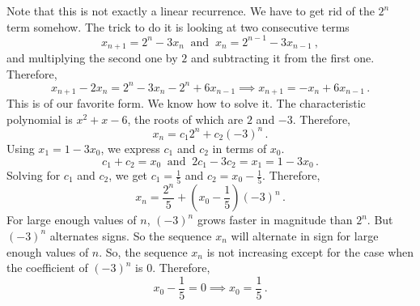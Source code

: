 \documentclass[11pt]{scrartcl}
\begin{document}
\begin{soln}
Note that this is not exactly a linear recurrence. We have to get rid of the \(2^n\) term somehow. The trick to do it is looking at two consecutive terms
\[ x_{n+1} = 2^n - 3x_n \ \text{ and } \ x_{n} = 2^{n-1} - 3x_{n-1} \ , \]
and multiplying the second one by \(2\) and subtracting it from the first one. Therefore,
\[ x_{n+1} - 2x_{n} = 2^n - 3x_n - 2^{n} + 6x_{n-1} \implies x_{n+1} = -x_n+6x_{n-1} \, . \]
This is of our favorite form. We know how to solve it. The characteristic polynomial is \(x^2 + x -6\), the roots of which are \(2\) and \(-3\). Therefore,
\[ x_n = c_1 2^n + c_2  \left(-3\right) ^n \, .\]
Using \(x_1 = 1- 3x_0\), we express \(c_1\) and \(c_2\) in terms of \(x_0\).
\[ c_1+c_2 = x_0 \ \text{ and } \ 2c_1 - 3c_2 = x_1 =  1- 3x_0 \, . \]
Solving for \(c_1\) and \(c_2\), we get \(c_1 = \frac{1}{5}\) and \(c_2 = x_0 - \frac{1}{5}\). Therefore,
\[ x_n =  \frac{2^n}{5} +  \left(x_0 - \frac{1}{5}\right)  \left(-3\right) ^n \, . \]
For large enough values of \(n\), \(\left(-3\right)^n\) grows faster in magnitude than \(2^n\). But \(\left(-3\right) ^n\) alternates signs. So the sequence \(x_n\) will alternate in sign for large enough values of \(n\). So, the sequence \(x_n\) is not increasing except for the case when the coefficient of \(\left(-3\right) ^n\) is \(0\). Therefore,
\[ x_0 - \frac{1}{5} = 0\implies x_0 = \frac{1}{5} \, .\]
\end{soln}
\end{document}
